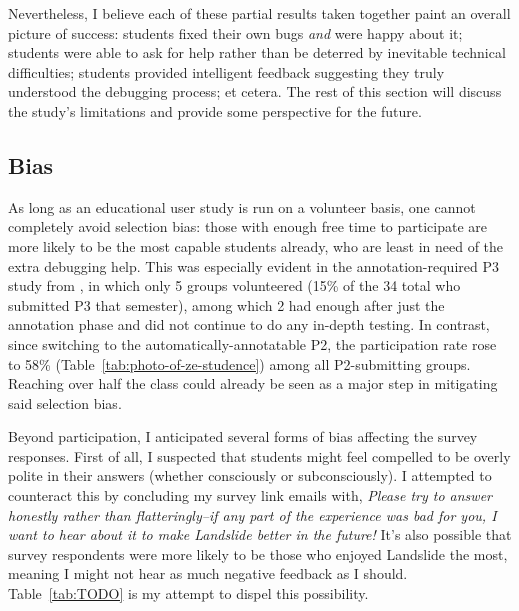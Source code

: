 Nevertheless, I believe each of these partial results taken together
paint an overall picture of success:
students fixed their own bugs {\em and} were happy about it;
students were able to ask for help rather than be deterred by inevitable technical difficulties;
students provided intelligent feedback suggesting they truly understood the debugging process;
et cetera.
%
The rest of this section will discuss the study's limitations and provide some perspective for the future.

\subsection{Bias}


As long as an educational user study is run on a volunteer basis,
one cannot completely avoid selection bias:
those with enough free time to participate are more likely to be the most capable students already,
who are least in need of the extra debugging help.
This was especially evident in the annotation-required P3 study from \cite{landslide},
in which only 5 groups volunteered (15\% of the 34 total who submitted P3 that semester),
among which 2 had enough after just the annotation phase and did not continue to do any in-depth testing.
In contrast, since switching to the automatically-annotatable P2,
the participation rate rose to 58\% (Table~\ref{tab:photo-of-ze-studence})
among all P2-submitting groups.
Reaching over half the class could already be seen as a major step in mitigating said selection bias.

Beyond participation, I anticipated several forms of bias affecting the survey responses.
First of all, I suspected that students might feel compelled to be overly polite in their answers
(whether consciously or subconsciously).
I attempted to counteract this by concluding my survey link emails with,
{\em Please try to answer honestly rather than flatteringly--if any part
of the experience was bad for you, I want to hear about it to make
Landslide better in the future!}
It's also possible that survey respondents %
were more likely to be those who enjoyed Landslide the most,
meaning I might not hear as much negative feedback as I should.
Table~\ref{tab:TODO} %
is my attempt to dispel this possibility.

